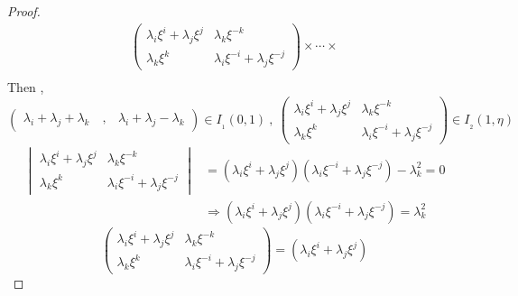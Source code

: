 \documentclass{article}
\begin{document}
\begin{proof}
\begin{align*}
\begin{pmatrix}
             \lambda_i\xi^{\scriptscriptstyle i}+\lambda_j\xi^{\scriptscriptstyle j}&\lambda_k\xi^{\scriptscriptstyle-k}\\
            \lambda_k\xi^{\scriptscriptstyle k}&\lambda_i\xi^{\scriptscriptstyle-i}+\lambda_j\xi^{\scriptscriptstyle-j}
        \end{pmatrix}
        \times\cdots\times\\
\end{align*}
Then ,\\
    $\begin{pmatrix}
           \lambda_i+\lambda_j+\lambda_k\quad,&\lambda_i+\lambda_j-\lambda_k 
        \end{pmatrix}\in{I_{_1}(0,1)}
        \:,\:
        \begin{pmatrix}
             \lambda_i\xi^{\scriptscriptstyle i}+\lambda_j\xi^{\scriptscriptstyle j}&\lambda_k\xi^{\scriptscriptstyle-k}\\
            \lambda_k\xi^{\scriptscriptstyle k}&\lambda_i\xi^{\scriptscriptstyle-i}+\lambda_j\xi^{\scriptscriptstyle-j}
        \end{pmatrix}\in{I_{_2}(1,\eta)}$\\
        \begin{align*}
         \begin{vmatrix}
             \lambda_i\xi^{\scriptscriptstyle i}+\lambda_j\xi^{\scriptscriptstyle j}&\lambda_k\xi^{\scriptscriptstyle-k}\\
            \lambda_k\xi^{\scriptscriptstyle k}&\lambda_i\xi^{\scriptscriptstyle-i}+\lambda_j\xi^{\scriptscriptstyle-j}
        \end{vmatrix}&=(\lambda_i\xi^{\scriptscriptstyle i}+\lambda_j\xi^{\scriptscriptstyle j})(\lambda_i\xi^{\scriptscriptstyle-i}+\lambda_j\xi^{\scriptscriptstyle-j})-\lambda_k^{\scriptscriptstyle2}=0\\
        &\Rightarrow(\lambda_i\xi^{\scriptscriptstyle i}+\lambda_j\xi^{\scriptscriptstyle j})(\lambda_i\xi^{\scriptscriptstyle-i}+\lambda_j\xi^{\scriptscriptstyle-j})=\lambda_k^{\scriptscriptstyle2}
    \end{align*}
\begin{equation*}
            \begin{pmatrix}
             \lambda_i\xi^{\scriptscriptstyle i}+\lambda_j\xi^{\scriptscriptstyle j}&\lambda_k\xi^{\scriptscriptstyle-k}\\
            \lambda_k\xi^{\scriptscriptstyle k}&\lambda_i\xi^{\scriptscriptstyle-i}+\lambda_j\xi^{\scriptscriptstyle-j}
        \end{pmatrix}=(\lambda_i\xi^{\scriptscriptstyle i}+\lambda_j\xi^{\scriptscriptstyle j})

\end{equation*}
\end{proof}
\end{document}
